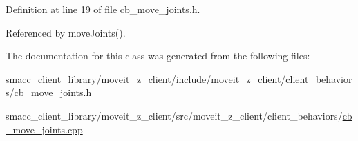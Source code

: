 Definition at line 19 of file cb\+\_\+move\+\_\+joints.\+h.



Referenced by move\+Joints().



The documentation for this class was generated from the following files\+:\begin{DoxyCompactItemize}
\item 
smacc\+\_\+client\+\_\+library/moveit\+\_\+z\+\_\+client/include/moveit\+\_\+z\+\_\+client/client\+\_\+behaviors/\hyperlink{cb__move__joints_8h}{cb\+\_\+move\+\_\+joints.\+h}\item 
smacc\+\_\+client\+\_\+library/moveit\+\_\+z\+\_\+client/src/moveit\+\_\+z\+\_\+client/client\+\_\+behaviors/\hyperlink{cb__move__joints_8cpp}{cb\+\_\+move\+\_\+joints.\+cpp}\end{DoxyCompactItemize}
